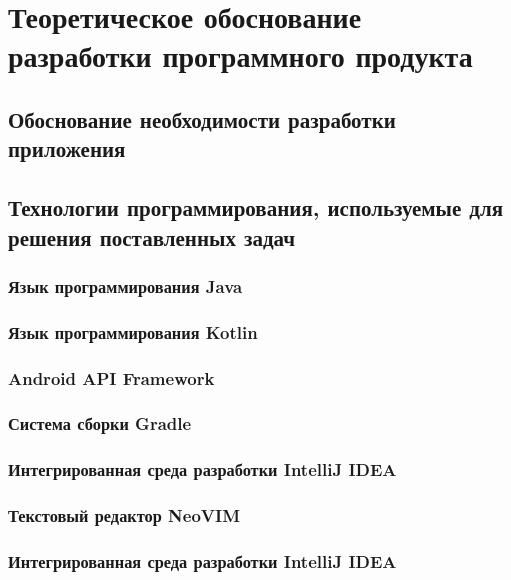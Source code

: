 
\section{Теоретическое обоснование разработки программного продукта} 
\label{sec:theory_and_motivation}


\subsection{Обоснование необходимости разработки приложения}
\label{sub:theory_and_motivation:motivation}


\subsection{Технологии программирования, используемые для решения поставленных задач}
\label{sub:theory_and_motivation:tools}


\subsubsection{Язык программирования Java}
\label{subsub:theory_and_motivation:tools:java}

\subsubsection{Язык программирования Kotlin}
\label{subsub:theory_and_motivation:tools:kotlin}

\subsubsection{Android API Framework}
\label{subsub:theory_and_motivation:tools:android_api_framework}

\subsubsection{Система сборки Gradle}
\label{subsub:theory_and_motivation:tools:gradle}

\subsubsection{Интегрированная среда разработки IntelliJ IDEA}
\label{subsub:theory_and_motivation:tools:intellij_idea}

\subsubsection{Текстовый редактор NeoVIM}
\label{subsub:theory_and_motivation:tools:neovim}

\subsubsection{Интегрированная среда разработки IntelliJ IDEA}
\label{subsub:theory_and_motivation:tools:intellij_idea}
